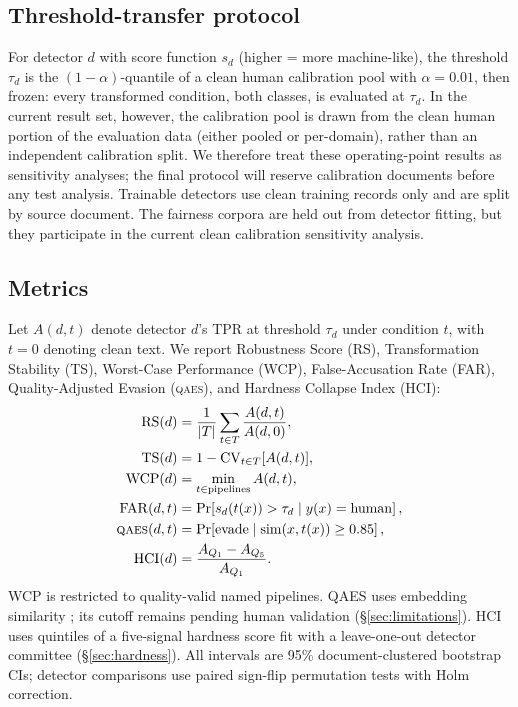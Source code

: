 \documentclass[11pt]{article}
\newcommand{\qaes}{\textsc{qaes}}
\begin{document}
\subsection{Threshold-transfer protocol}
For detector $d$ with score function $s_d$ (higher = more machine-like), the
threshold $\tau_d$ is the $(1-\alpha)$-quantile of a clean human calibration
pool with $\alpha = 0.01$, then frozen: every transformed condition, both
classes, is evaluated at $\tau_d$. In the current result set, however, the
calibration pool is drawn from the clean human portion of the evaluation data
(either pooled or per-domain), rather than an independent calibration split.
We therefore treat these operating-point results as sensitivity analyses; the
final protocol will reserve calibration documents before any test analysis.
Trainable detectors use clean training records only and are split by source
document. The fairness corpora are held out from detector fitting, but they
participate in the current clean calibration sensitivity analysis.

\subsection{Metrics}
Let $A(d,t)$ denote detector $d$'s TPR at threshold $\tau_d$ under condition
$t$, with $t{=}0$ denoting clean text. We report Robustness Score (RS),
Transformation Stability (TS), Worst-Case Performance (WCP), False-Accusation
Rate (FAR), Quality-Adjusted Evasion (\qaes), and Hardness Collapse Index (HCI):
\begin{align*}
\mathrm{RS}(d)   &= \frac{1}{|T|}\sum_{t \in T}\frac{A(d,t)}{A(d,0)}, \\
\mathrm{TS}(d)   &= 1-\mathrm{CV}_{t \in T}[A(d,t)], \\
\mathrm{WCP}(d)  &= \min_{t \in \text{pipelines}} A(d,t), \\
\mathrm{FAR}(d,t)&= \Pr\!\left[s_d(t(x))>\tau_d \mid y(x)=\mathrm{human}\right], \\
\qaes(d,t)       &= \Pr\!\left[\mathrm{evade} \mid
  \mathrm{sim}(x,t(x))\geq0.85\right], \\
\mathrm{HCI}(d)  &= \frac{A_{Q_1}-A_{Q_5}}{A_{Q_1}}.
\end{align*}
WCP is restricted to quality-valid named pipelines. QAES uses embedding
similarity \citep{reimers2019sentencebert}; its cutoff remains pending human
validation (\S\ref{sec:limitations}). HCI uses quintiles of a five-signal
hardness score fit with a leave-one-out detector committee
(\S\ref{sec:hardness}). All intervals are 95\% document-clustered bootstrap
CIs; detector comparisons use paired sign-flip permutation tests with Holm
correction.
\end{document}

